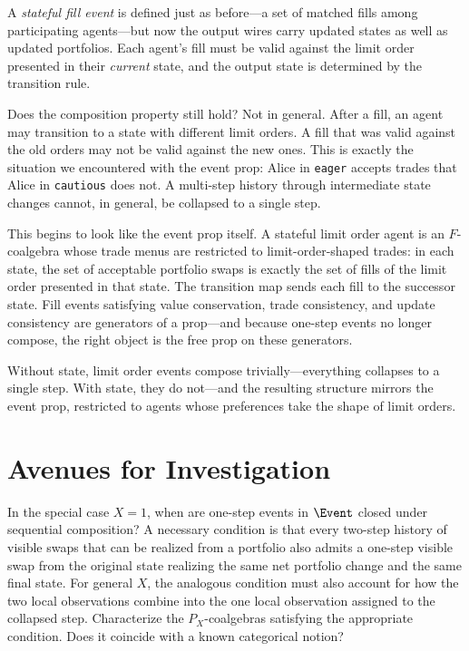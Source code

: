 A \emph{stateful fill event} is defined just as before---a set of matched fills among participating agents---but now the output wires carry updated states as well as updated portfolios.  Each agent's fill must be valid against the limit order presented in their \emph{current} state, and the output state is determined by the transition rule.

Does the composition property still hold?  Not in general.  After a fill, an agent may transition to a state with different limit orders.  A fill that was valid against the old orders may not be valid against the new ones.  This is exactly the situation we encountered with the event prop: Alice in \texttt{eager} accepts trades that Alice in \texttt{cautious} does not.  A multi-step history through intermediate state changes cannot, in general, be collapsed to a single step.

This begins to look like the event prop itself.  A stateful limit order agent is an $F$-coalgebra whose trade menus are restricted to limit-order-shaped trades: in each state, the set of acceptable portfolio swaps is exactly the set of fills of the limit order presented in that state.  The transition map sends each fill to the successor state.  Fill events satisfying value conservation, trade consistency, and update consistency are generators of a prop---and because one-step events no longer compose, the right object is the free prop on these generators.

\begin{remark}
Without state, limit order events compose trivially---everything collapses to a single step.  With state, they do not---and the resulting structure mirrors the event prop, restricted to agents whose preferences take the shape of limit orders.
\end{remark}

\section*{Avenues for Investigation}

\begin{question}
In the special case $X=1$, when are one-step events in $\Event$ closed under sequential composition?  A necessary condition is that every two-step history of visible swaps that can be realized from a portfolio also admits a one-step visible swap from the original state realizing the same net portfolio change and the same final state.  For general $X$, the analogous condition must also account for how the two local observations combine into the one local observation assigned to the collapsed step.  Characterize the $P_X$-coalgebras satisfying the appropriate condition.  Does it coincide with a known categorical notion?
\end{question}


